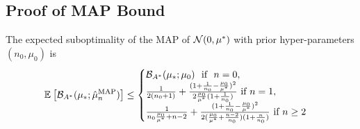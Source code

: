 \documentclass{article}
\newcommand*{\expect}[2][]{\ensuremath{\mathbb{E}_{#1} \left[ #2 \right] }} %
\newcommand{\logpart}{A}
\newcommand{\bregmanconj}{\cB_{\logpart^*}}
\begin{document}
\subsection{Proof of MAP Bound}
\begin{theorem}
 The expected suboptimality of the MAP of ${\mathcal N}(0,\mu^*)$ with prior hyper-parameters $(n_0,\mu_0)$ is 
\begin{equation}
	\expect{\bregmanconj( \mu_*; \hat \mu_n^\text{MAP})}
	\leq \begin{cases}
		\bregmanconj( \mu_*; \mu_0) \ \text{ if } \ n=0, \\
		\inv{2(n_0+1)}  + \frac{(1 + \inv{n_0} - \frac{\mu_0}{\mu^*})^2}{2 \frac{\mu_0}{\mu^*}(1 + \inv{n_0} )} \ \text{if}\ n=1,\\
		\frac{1}{n_0 \frac{\mu_0}{\mu^*} +n-2} + \frac{(1 + \inv{n_0} - \frac{\mu_0}{\mu^*})^2}{2 (\frac{\mu_0}{\mu^*}+\frac{n-2}{n_0})(1 + \frac{n}{n_0} )} \ \text{if}\ n\geq 2
	\end{cases}
\end{equation}
\end{theorem} 
\end{document}

